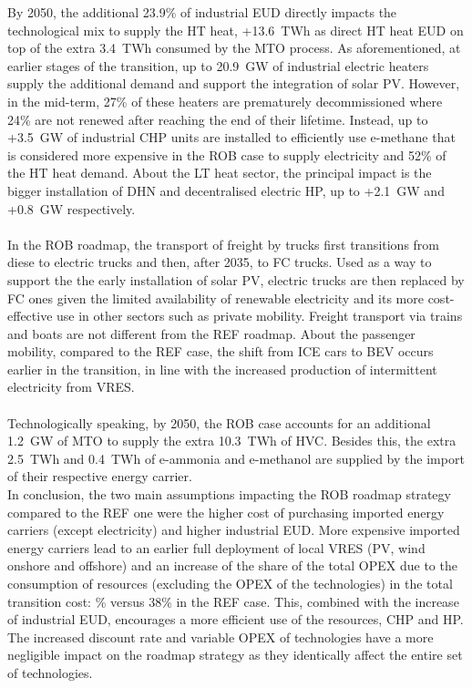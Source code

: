 By 2050, the additional 23.9\% of industrial \gls{EUD} directly impacts the technological mix to supply the \gls{HT} heat, \ie +13.6~TWh as direct \gls{HT} heat \gls{EUD} on top of the extra 3.4~TWh consumed by the \gls{MTO} process. As aforementioned, at earlier stages of the transition, up to 20.9~GW of industrial electric heaters supply the additional demand and support the integration of solar \gls{PV}.  However, in the mid-term, 27\% of these heaters are prematurely decommissioned where 24\% are not renewed after reaching the end of their lifetime. Instead, up to +3.5~GW of industrial \gls{CHP} units are installed to efficiently use e-methane that is considered more expensive in the ROB case to supply electricity and 52\% of the \gls{HT} heat demand. About the \gls{LT} heat sector, the principal impact is the bigger installation of \gls{DHN} and decentralised electric \gls{HP}, up to +2.1~GW and +0.8~GW respectively. \\

\\

In the ROB roadmap, the transport of freight by trucks first transitions from diese to electric trucks and then, after 2035, to \gls{FC} trucks. Used as a way to support the the early installation of solar \gls{PV}, electric trucks are then replaced by \gls{FC} ones given the limited availability of renewable electricity and its more cost-effective use in other sectors such as private mobility. Freight transport via trains and boats are not different from the REF roadmap. About the passenger mobility, compared to the REF case, the shift from \gls{ICE} cars to \gls{BEV} occurs earlier in the transition, in line with the increased production of intermittent electricity from \gls{VRES}. \\

\\

Technologically speaking, by 2050, the ROB case accounts for an additional 1.2~GW of \gls{MTO} to supply the extra 10.3~TWh of \gls{HVC}. Besides this, the extra 2.5~TWh and 0.4~TWh of e-ammonia and e-methanol are supplied by the import of their respective energy carrier.\\

In conclusion, the two main assumptions impacting the ROB roadmap strategy compared to the REF one were the higher cost of purchasing imported energy carriers (except electricity) and higher industrial \gls{EUD}. More expensive imported energy carriers lead to an earlier full deployment of local \gls{VRES} (\ie \gls{PV}, wind onshore and offshore) and an increase of the share of the total OPEX due to the consumption of resources (\ie excluding the OPEX of the technologies) in the total transition cost: \% versus 38\% in the REF case. This, combined with the increase of industrial \gls{EUD}, encourages a more efficient use of the resources, \ie \gls{CHP} and \gls{HP}. The increased discount rate and variable OPEX of technologies have a more negligible impact on the roadmap strategy as they identically affect the entire set of technologies.

